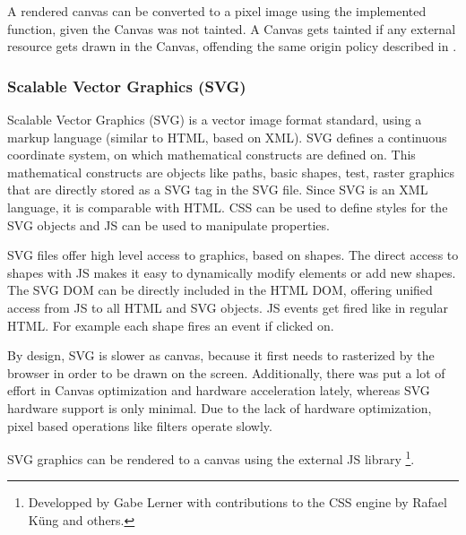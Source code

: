 A rendered canvas can be converted to a pixel image using the implemented  function, given the Canvas was not tainted.
A Canvas gets tainted if any external resource gets drawn in the Canvas, offending the same origin policy described in .

\subsubsection{Scalable Vector Graphics (SVG)}
\label{sec:svg}

Scalable Vector Graphics (SVG) is a vector image format standard, using a markup language (similar to HTML, based on XML).
SVG defines a continuous coordinate system, on which mathematical constructs are defined on.
This mathematical constructs are objects like paths, basic shapes, test, raster graphics that are directly stored as a SVG tag in the SVG file.
Since SVG is an XML language, it is comparable with HTML.
CSS can be used to define styles for the SVG objects and JS can be used to manipulate properties.

SVG files offer high level access to graphics, based on shapes.
The direct access to shapes with JS makes it easy to dynamically modify elements or add new shapes.
The SVG DOM can be directly included in the HTML DOM, offering unified access from JS to all HTML and SVG objects.
JS events get fired like in regular HTML.
For example each shape fires an  event if clicked on.


By design, SVG is slower as canvas, because it first needs to rasterized by the browser in order to be drawn on the screen.
Additionally, there was put a lot of effort in Canvas optimization and hardware acceleration lately, whereas SVG hardware support is only minimal.
Due to the lack of hardware optimization, pixel based operations like filters operate slowly.

SVG graphics can be rendered to a canvas using the external JS library \footnote{Developped by Gabe Lerner with contributions to the CSS engine by Rafael Küng and others.}.





